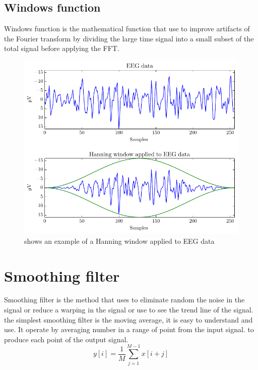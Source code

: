 \subsection{Windows function}
\hspace{1.5cm} Windows function is the mathematical function that use to improve artifacts of the Fourier transform by dividing the large time signal into a small subset of the total signal before applying the FFT.\\

\begin{figure}[ht]
	\centering
	\includegraphics[scale = 0.75]{chapter3/window.pdf}
	\caption{shows an example of a Hanning window applied to EEG data\cite{ft}}
    \label{fig:window}
\end{figure}


\section{Smoothing filter}
\hspace{1.5cm}Smoothing filter is the method that uses to eliminate random the noise in the signal or reduce a warping in the signal or use to see the trend line of the signal. the simplest smoothing filter is the moving average, it is easy to understand and use. It operate by averaging number in a range of point from the input signal. to produce each point of the output signal. \\
\begin{equation}\label{eq:win}
	 y[i] = \frac{1}{M}\sum\limits ^{M-1}_{j=1} x[i+j]
\end{equation}

